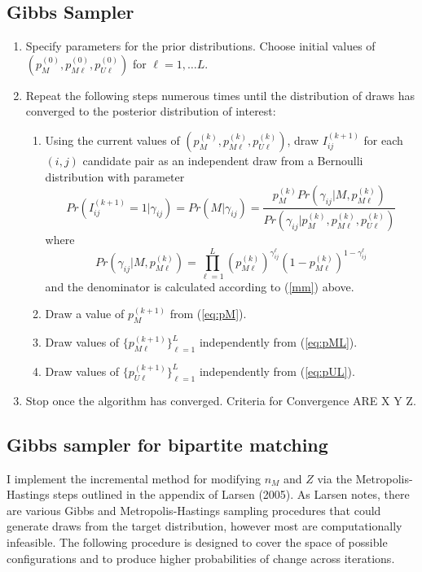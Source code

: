 \documentclass[11pt,reqno]{amsart}
\begin{document}
\subsection{Gibbs Sampler \citep{larsen_2005}}
\label{app:simple_gibbs}
\begin{enumerate}
\item Specify parameters for the prior distributions.  Choose initial values of $\left(p_M^{(0)}, p_{M\ell}^{(0)}, p_{U\ell}^{(0)}\right)$ for $\ell=1,\dots L$.  

\item Repeat the following steps numerous times until the distribution of draws has converged to the posterior distribution of interest:
\begin{enumerate}

\item Using the current values of $\left(p_M^{(k)}, p_{M\ell}^{(k)}, p_{U\ell}^{(k)}\right)$, draw $I_{ij}^{(k+1)}$ for each $(i,j)$ candidate pair as an independent draw from a Bernoulli distribution with parameter
\begin{equation}
Pr\left( I_{ij}^{(k+1)}=1 \Big| \gamma_{ij}\right) = Pr\left(M | \gamma_{ij}\right) = \frac{p_M^{(k)}Pr\left(\gamma_{ij} | M, p_{M\ell}^{(k)} \right)}{Pr\left(\gamma_{ij} \Big | p_M^{(k)}, p_{M\ell}^{(k)}, p_{U\ell}^{(k)}\right)}
\end{equation} where 
$$ Pr\left(\gamma_{ij} | M, p_{M\ell}^{(k)} \right) = \prod_{\ell=1}^L  \left(p_{M\ell}^{(k)}\right)^{\gamma_{ij}^{\ell}}\left(1-p_{M\ell}^{(k)}\right)^{1-\gamma_{ij}^{\ell}}$$ and the denominator is calculated according to (\ref{mm}) above. 
\item Draw a value of $p_M^{(k+1)}$ from (\ref{eq:pM}).
\item Draw values of $\{p_{M\ell}^{(k+1)}\}_{\ell=1}^L$ independently from (\ref{eq:pML}). 
\item Draw values of $\{p_{U\ell}^{(k+1)}\}_{\ell=1}^L$ independently from (\ref{eq:pUL}). 
\end{enumerate}
\item Stop once the algorithm has converged.  Criteria for Convergence ARE X Y Z. %
\end{enumerate}

\subsection{Gibbs sampler for bipartite matching}
I implement the incremental method for modifying $n_M$ and $Z$ via the Metropolis-Hastings steps outlined in the appendix of Larsen (2005).  As Larsen notes, there are various Gibbs and Metropolis-Hastings sampling procedures that could generate draws from the target distribution, however most are computationally infeasible.  The following procedure is designed to cover the space of possible configurations and to produce higher probabilities of change across iterations.  
\end{document}
